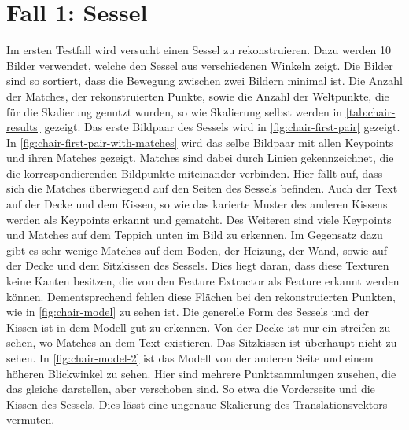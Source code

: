 \section{Fall 1: Sessel}
\label{sec:textcase-chair}
Im ersten Testfall wird versucht einen Sessel zu rekonstruieren.
Dazu werden 10 Bilder verwendet, welche den Sessel aus verschiedenen Winkeln zeigt.
Die Bilder sind so sortiert, dass die Bewegung zwischen zwei Bildern minimal ist.
Die Anzahl der Matches, der rekonstruierten Punkte, sowie die Anzahl der Weltpunkte, die für die Skalierung genutzt wurden, so wie Skalierung selbst werden in \cref{tab:chair-results} gezeigt. %
Das erste Bildpaar des Sessels wird in \cref{fig:chair-first-pair} gezeigt.
In \cref{fig:chair-first-pair-with-matches} wird das selbe Bildpaar mit allen Keypoints und ihren Matches gezeigt.
Matches sind dabei durch Linien gekennzeichnet, die die korrespondierenden Bildpunkte miteinander verbinden.
Hier fällt auf, dass sich die Matches überwiegend auf den Seiten des Sessels befinden.
Auch der Text auf der Decke und dem Kissen, so wie das karierte Muster des anderen Kissens werden als Keypoints erkannt und gematcht. %
Des Weiteren sind viele Keypoints und Matches auf dem Teppich unten im Bild zu erkennen.
Im Gegensatz dazu gibt es sehr wenige Matches auf dem Boden, der Heizung, der Wand, sowie auf der Decke und dem Sitzkissen des Sessels.
Dies liegt daran, dass diese Texturen keine Kanten besitzen, die von den Feature Extractor als Feature erkannt werden können.
Dementsprechend fehlen diese Flächen bei den rekonstruierten Punkten, wie in \cref{fig:chair-model} zu sehen ist.  
Die generelle Form des Sessels und der Kissen ist in dem Modell gut zu erkennen.
Von der Decke ist nur ein streifen zu sehen, wo Matches an dem Text existieren.  
Das Sitzkissen ist überhaupt nicht zu sehen.
In \cref{fig:chair-model-2} ist das Modell von der anderen Seite und einem höheren Blickwinkel zu sehen.
Hier sind mehrere Punktsammlungen zusehen, die das gleiche darstellen, aber verschoben sind.
So etwa die Vorderseite und die Kissen des Sessels.
Dies lässt eine ungenaue Skalierung des Translationsvektors vermuten.

